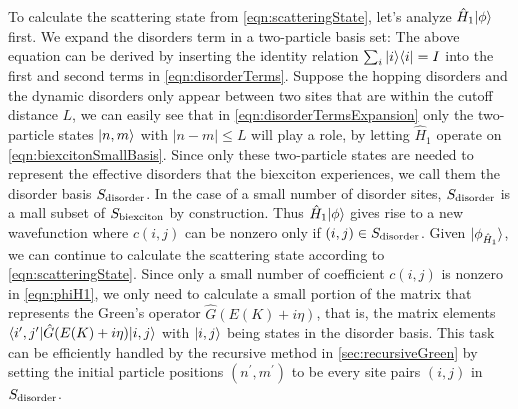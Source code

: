 To calculate the scattering state from \autoref{eqn:scatteringState}, let's analyze $\hat{H}_1 | \phi  \rangle$ first. 
We expand the disorders term in a two-particle basis set:
The above equation can be derived by inserting the identity relation $\sum_{i} | i \rangle\langle i | = I$ into the first and 
second terms in \autoref{eqn:disorderTerms}. Suppose the hopping disorders and the dynamic disorders only appear
between two sites that are within the cutoff distance $L$, we can easily see that in 
\autoref{eqn:disorderTermsExpansion} only  the two-particle states $| n, m \rangle$ with $|n-m|\leq L$ will play a role, by letting $\hat{H}_1$ operate on 
\autoref{eqn:biexcitonSmallBasis}. Since only these two-particle states are needed to represent the effective
 disorders that the biexciton experiences, we call them the disorder basis $S_{\rm disorder}$. In the case of a small 
number of disorder sites, $S_{\rm disorder}$ is a mall subset of $S_{\rm biexciton}$ by construction. Thus 
$\hat{H}_1 | \phi  \rangle$ gives rise to a new wavefunction 
where $ c(i, j)$ can be nonzero only if  $(i, j) \in S_{\rm disorder} $. Given
 $| \phi_{\hat{H}_1} \rangle$, we can continue to calculate the scattering state according to 
\autoref{eqn:scatteringState}. Since only a small number of coefficient $c(i, j)$ is nonzero in \autoref{eqn:phiH1}, 
we only need to calculate a small portion of the matrix that represents the Green's operator 
$\hat{G}(E(K) + i\eta)$, that is, the matrix elements $\langle i^{\prime}, j^{\prime} |\hat{G}(E(K) + i\eta) | i, j \rangle$ 
with $| i, j \rangle$ being states in the disorder basis. This task can be efficiently handled by the recursive method in
\autoref{sec:recursiveGreen} by setting the initial particle positions $(n^{\prime}, m^{\prime})$ to be every site 
pairs $(i, j)$ in $S_{\rm disorder}$. 

